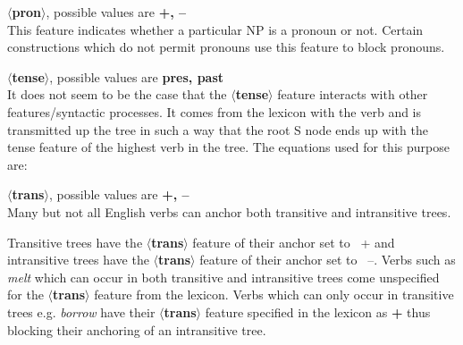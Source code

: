 

{\bf $\langle$pron$\rangle$}, possible values are {\bf +, --}\\
This feature indicates whether a particular NP is a pronoun or not. 
Certain constructions which do not permit pronouns use this 
feature to block pronouns.

{\bf $\langle$tense$\rangle$}, possible values are {\bf pres, past}\\
It does not seem to be the case that the {\bf $\langle$tense$\rangle$}
feature interacts with other features/syntactic processes. It 
comes from the lexicon with the verb and is transmitted up the
tree in such a way that the root S node ends up with the
tense feature of the highest verb in the tree. The equations
used for this purpose are:



{\bf $\langle$trans$\rangle$}, possible values are {\bf +, --}\\
Many but not all English verbs can anchor both transitive and intransitive trees.


Transitive trees have the {\bf $\langle$trans$\rangle$} feature of their
anchor set to {\ +} and intransitive trees have the 
{\bf $\langle$trans$\rangle$} feature of their
anchor set to {\ --}. Verbs such as {\em melt} which can occur 
in both transitive and intransitive trees come unspecified for the 
{\bf $\langle$trans$\rangle$} feature from the lexicon. Verbs which 
can only occur in transitive trees e.g. {\em borrow} have their
{\bf $\langle$trans$\rangle$} feature 
specified in the lexicon as {\bf +} thus blocking their anchoring of 
an intransitive tree.


